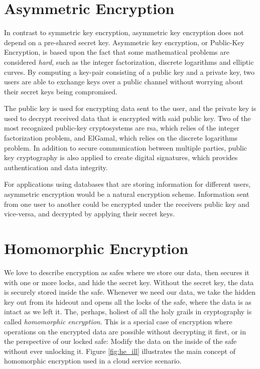 \section{Asymmetric Encryption}

In contrast to symmetric key encryption, asymmetric key encryption does not depend on a pre-shared secret key. Asymmetric key encryption, or Public-Key Encryption, is based upon the fact that some mathematical problems are considered \emph{hard}, such as the integer factorization, discrete logarithms and elliptic curves. By computing a key-pair consisting of a public key and a private key, two users are able to exchange keys over a public channel without worrying about their secret keys being compromised.

The public key is used for encrypting data sent to the user, and the private key is used to decrypt received data that is encrypted with said public key. Two of the most recognized public-key cryptosystems are \gls{rsa}, which relies of the integer factorization problem, and ElGamal, which relies on the discrete logarithms problem. In addition to secure communication between multiple parties, public key cryptography is also applied to create digital signatures, which provides authentication and data integrity.

For applications using databases that are storing information for different users, asymmetric encryption would be a natural encryption scheme. Information sent from one user to another could be encrypted under the receivers public key and vice-versa, and decrypted by applying their secret keys.


\section{Homomorphic Encryption}

We love to describe encryption as safes where we store our data, then secures it with one or more locks, and hide the secret key. Without the secret key, the data is securely stored inside the safe. Whenever we need our data, we take the hidden key out from its hideout and opens all the locks of the safe, where the data is as intact as we left it. The, perhaps, holiest of all the holy grails in cryptography is called \emph{homomorphic encryption}. This is a special case of encryption where operations on the encrypted data are possible without decrypting it first, or in the perspective of our locked safe: Modify the data on the inside of the safe without ever unlocking it. Figure \ref{fig:he_ill} illustrates the main concept of homomorphic encryption used in a cloud service scenario.

